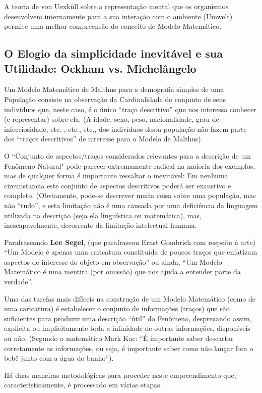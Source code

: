     A teoria de von Uexküll sobre a representação mental que os organismos desenvolvem internamente para a sua interação com o ambiente (Umwelt) permite uma melhor compreensão do conceito de Modelo Matemático.

\subsection{O Elogio da simplicidade inevitável e sua Utilidade: Ockham vs. Michelângelo}

    Um Modelo Matemático de Malthus para a demografia simples de uma População consiste na observação da Cardinalidade do conjunto de seus indivíduos que, neste caso, é o único ``traço descritivo'' que nos interessa conhecer (e representar) sobre ela. (A idade, sexo, peso, nacionalidade, grau de infecciosidade, etc. , etc., etc., dos indivíduos desta população não fazem parte dos ``traços descritivos'' de interesse para o Modelo de Malthus).

    O ``Conjunto de aspectos/traços considerados relevantes para a descrição de um Fenômeno Natural" pode parecer extremamente radical na maioria dos exemplos, mas de qualquer forma é importante ressaltar o inevitável: Em nenhuma circunstancia este conjunto de aspectos descritivos poderá ser exaustivo e completo. (Obviamente, pode-se descrever muita coisa sobre uma população, mas não ``tudo'', e esta limitação não é uma causada por uma deficiência da linguagem utilizada na descrição (seja ela linguística ou matemática), mas, inescapavelmente, decorrente da limitação intelectual humana.

    Parafraseando \textbf{Lee Segel}, (que parafraseou Ernst Gombrich com respeito à arte) ``Um Modelo é apenas uma caricatura constituída de poucos traços que enfatizam aspectos de interesse do objeto em observação'' ou ainda, ``Um Modelo Matemático é uma mentira (por omissão) que nos ajuda a entender parte da verdade''.

    Uma das tarefas mais difíceis na construção de um Modelo Matemático (como de uma caricatura) é estabelecer o conjunto de informações (traços) que são suficientes para produzir uma descrição ``útil'' do Fenômeno, desprezando assim, explicita ou implicitamente toda a infinidade de outras informações, disponíveis ou não. (Segundo o matemático Mark Kac: ``É importante saber descartar corretamente as informações, ou seja, é importante saber como não lançar fora o bebê junto com a água do banho'').

    Há duas maneiras metodológicas para proceder neste empreendimento que, caracteristicamente, é processado em várias etapas.

